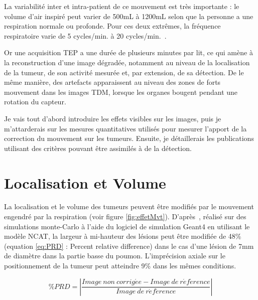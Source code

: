 La variabilité inter et intra-patient de ce mouvement est très importante : le volume d'air inspiré peut varier de 500mL à 1200mL selon que la personne a une respiration normale ou profonde. Pour ces deux extrêmes, la fréquence respiratoire varie de 5 cycles/min. à 20 cycles/min.~\cite{sherwood2006fundamentals}.

Or une acquisition TEP a une durée de plusieurs minutes par lit, ce qui amène à la reconstruction d'une image dégradée, notamment au niveau de la localisation de la tumeur, de son activité mesurée et, par extension, de sa détection. De le même manière, des artefacts apparaissent au niveau des zones de forts mouvement dans les images TDM, lorsque les organes bougent pendant une rotation du capteur.

Je vais tout d'abord introduire les effets visibles sur les images, puis je m'attarderais sur les mesures quantitatives utilisés pour mesurer l'apport de la correction du mouvement sur les tumeurs. Ensuite, je détaillerais les publications utilisant des critères pouvant être assimilés à de la détection.

\section{Localisation et Volume}


La localisation et le volume des tumeurs peuvent être modifiés par le mouvement engendré par la respiration (voir figure \ref{fig:effetMvt}). D'après~\cite{lamare2007respiratory}, réalisé sur des simulations monte-Carlo à l'aide du logiciel de simulation Geant4\cite{jan2004gate} en utilisant le modèle NCAT\cite{segars2001These}, la largeur à mi-hauteur des lésions peut être modifiée de 48\% (equation \ref{eq:PRD} : Percent relative difference) dans le cas d'une lésion de 7mm de diamètre dans la partie basse du poumon. L'imprécision axiale sur le positionnement de la tumeur peut atteindre 9\% dans les mêmes conditions.

\begin{equation}
\%PRD= \left| \frac{Image~non~corrig\acute{e}e - Image~de~r\acute{e}f\acute{e}rence}{Image~de~r\acute{e}f\acute{e}rence} \right|
\label{eq:PRD}
\end{equation}





